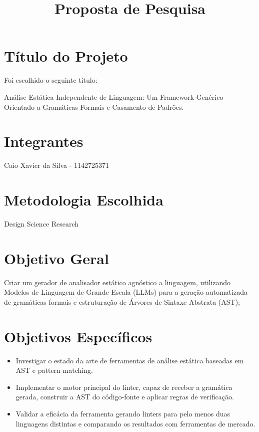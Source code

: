 \documentclass{article}
\title{Proposta de Pesquisa}
\author{}
\date{}
\begin{document}
\maketitle

\section*{Título do Projeto}

Foi escolhido o seguinte título:

Análise Estática Independente de Linguagem: Um Framework Genérico Orientado a Gramáticas Formais e Casamento de Padrões.

\section*{Integrantes}

Caio Xavier da Silva - 1142725371

\section*{Metodologia Escolhida}

Design Science Research

\section*{Objetivo Geral}

Criar um gerador de analisador estático agnóstico a linguagem, utilizando Modelos de Linguagem de Grande Escala (LLMs) para a geração automatizada de gramáticas formais e estruturação de Árvores de Sintaxe Abstrata (AST);

\section*{Objetivos Específicos}

\begin{itemize}

\item 
Investigar o estado da arte de ferramentas de análise estática baseadas em AST e pattern matching.

\item 
Implementar o motor principal do linter, capaz de receber a gramática gerada, construir a AST do código-fonte e aplicar regras de verificação.

\item 
Validar a eficácia da ferramenta gerando linters para pelo menos duas linguagens distintas e comparando os resultados com ferramentas de mercado.

\end{itemize}
\end{document}
